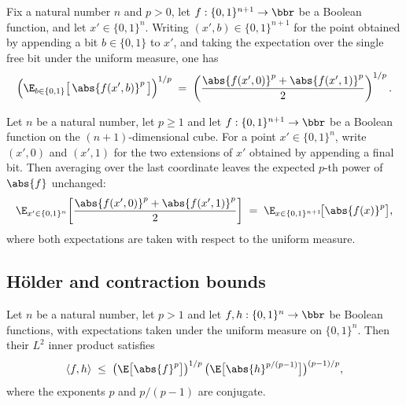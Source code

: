 \begin{lemma}
\label{BooleanAnalysis.Hypercontractivity.one_bit_norm_slice}
\leanok
{}
Fix a natural number $n$ and $p > 0$, let $f : \{0,1\}^{n+1} \to \bbr$ be a Boolean function, and let $x' \in
\{0,1\}^n$. Writing $(x', b) \in \{0,1\}^{n+1}$ for the point obtained by appending a
bit $b \in \{0,1\}$ to $x'$, and taking the expectation over the single free bit under
the uniform measure, one has
\[
  \Bigl(\E_{b \in \{0,1\}}\bigl[\,\abs{f(x', b)}^p\,\bigr]\Bigr)^{1/p}
  \;=\;
  \left(\frac{\abs{f(x', 0)}^p + \abs{f(x', 1)}^p}{2}\right)^{1/p}.
\]
\end{lemma}

\begin{lemma}
\label{BooleanAnalysis.Hypercontractivity.norm_collapse_clean}
\leanok
{}
Let $n$ be a natural number, let $p \ge 1$ and let $f : \{0,1\}^{n+1} \to \bbr$ be a Boolean function on the
$(n+1)$-dimensional cube. For a point $x' \in \{0,1\}^n$, write $(x',0)$ and $(x',1)$
for the two extensions of $x'$ obtained by appending a final bit. Then averaging over
the last coordinate leaves the expected $p$-th power of $\abs{f}$ unchanged:
\[
  \E_{x' \in \{0,1\}^n}\!\left[\frac{\abs{f(x',0)}^p + \abs{f(x',1)}^p}{2}\right]
  \;=\; \E_{x \in \{0,1\}^{n+1}}\!\bigl[\abs{f(x)}^p\bigr],
\]
where both expectations are taken with respect to the uniform measure.
\end{lemma}

\subsection{H\"older and contraction bounds}

\begin{lemma}
\label{BooleanAnalysis.Hypercontractivity.holder_ineq_bool}
\leanok
{}
Let $n$ be a natural number, let $p > 1$ and let $f, h : \{0,1\}^n \to \bbr$ be Boolean functions, with expectations
taken under the uniform measure on $\{0,1\}^n$. Then their $L^2$ inner product satisfies
\[
  \langle f, h\rangle \;\le\; \bigl(\E\bigl[\abs{f}^{p}\bigr]\bigr)^{1/p}\,
  \bigl(\E\bigl[\abs{h}^{p/(p-1)}\bigr]\bigr)^{(p-1)/p},
\]
where the exponents $p$ and $p/(p-1)$ are conjugate.
\end{lemma}

